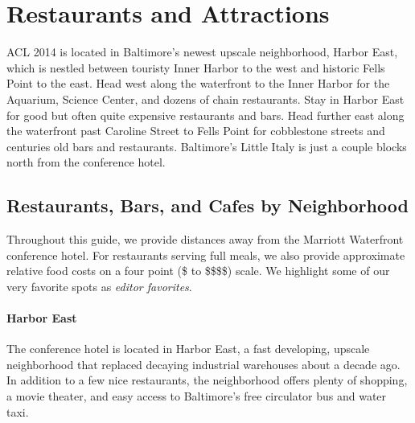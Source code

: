 \section[Restaurants and Attractions]{Restaurants and Attractions}
\thispagestyle{emptyheader}

ACL 2014 is located in Baltimore's newest upscale neighborhood, Harbor
East, which is nestled between touristy Inner Harbor to the west and
historic Fells Point to the east. Head west along the waterfront to
the Inner Harbor for the Aquarium, Science Center, and dozens of chain
restaurants. Stay in Harbor East for good but often quite expensive
restaurants and bars. Head further east along the waterfront past
Caroline Street to Fells Point for cobblestone streets and centuries
old bars and restaurants. Baltimore's Little Italy is just a couple
blocks north from the conference hotel.

\newcommand{\gradstudent}{\$\xspace}
\newcommand{\postdoc}{\$\$\xspace}
\newcommand{\professor}{\$\$\$\xspace}
\newcommand{\industry}{\$\$\$\$\xspace}

\newenvironment{restaurant}[6]{
  \item[#6]{#1 (#2, #3 miles away) #4 #5.}
}{}

\subsection*{Restaurants, Bars, and Cafes by Neighborhood}

Throughout this guide, we provide distances away from the Marriott
Waterfront conference hotel. For restaurants serving full meals, we
also provide approximate relative food costs on a four point (\gradstudent to
\industry) scale. We highlight some of our very favorite spots as {\it
  editor favorites}.

\paragraph*{Harbor East}
The conference hotel is located in Harbor East, a fast developing, upscale neighborhood that replaced decaying industrial warehouses about a decade ago. In addition to a few nice restaurants, the neighborhood offers plenty of shopping, a movie theater, and easy access to Baltimore's free circulator bus and water taxi. 

